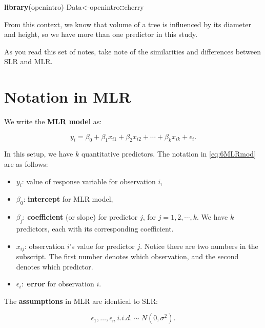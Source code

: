 \documentclass[
]{book}
\newenvironment{Shaded}{\begin{snugshade}}{\end{snugshade}}
\newcommand{\FunctionTok}[1]{\textcolor[rgb]{0.13,0.29,0.53}{\textbf{#1}}}
\newcommand{\NormalTok}[1]{#1}
\newcommand{\OtherTok}[1]{\textcolor[rgb]{0.56,0.35,0.01}{#1}}
\newcommand{\SpecialCharTok}[1]{\textcolor[rgb]{0.81,0.36,0.00}{\textbf{#1}}}
\providecommand{\tightlist}{%
  \setlength{\itemsep}{0pt}\setlength{\parskip}{0pt}}
\begin{document}
\begin{Shaded}
\begin{Highlighting}[]
\FunctionTok{library}\NormalTok{(openintro)}
\NormalTok{Data}\OtherTok{\textless{}{-}}\NormalTok{openintro}\SpecialCharTok{::}\NormalTok{cherry}
\end{Highlighting}
\end{Shaded}

From this context, we know that volume of a tree is influenced by its diameter and height, so we have more than one predictor in this study.

As you read this set of notes, take note of the similarities and differences between SLR and MLR.

\hypertarget{notation-in-mlr}{%
\section{Notation in MLR}\label{notation-in-mlr}}

We write the \textbf{MLR model} as:

\begin{equation} 
y_i = \beta_0+\beta_1 x_{i1} + \beta_2 x_{i2} + \cdots + \beta_{k} x_{i k} + \epsilon_i.
\label{eq:6MLRmod}
\end{equation}

In this setup, we have \(k\) quantitative predictors. The notation in \eqref{eq:6MLRmod} are as follows:

\begin{itemize}
\tightlist
\item
  \(y_i\): value of response variable for observation \(i\),
\item
  \(\beta_0\): \textbf{intercept} for MLR model,
\item
  \(\beta_j\): \textbf{coefficient} (or slope) for predictor \(j\), for \(j = 1, 2, \cdots, k\). We have \(k\) predictors, each with its corresponding coefficient.
\item
  \(x_{ij}\): observation \(i\)'s value for predictor \(j\). Notice there are two numbers in the subscript. The first number denotes which observation, and the second denotes which predictor.
\item
  \(\epsilon_i:\) \textbf{error} for observation \(i\).
\end{itemize}

The \textbf{assumptions} in MLR are identical to SLR:

\begin{equation} 
\epsilon_1,\ldots,\epsilon_n \ i.i.d. \sim N(0,\sigma^2).
\label{eq:6assumptions}
\end{equation}
\end{document}
